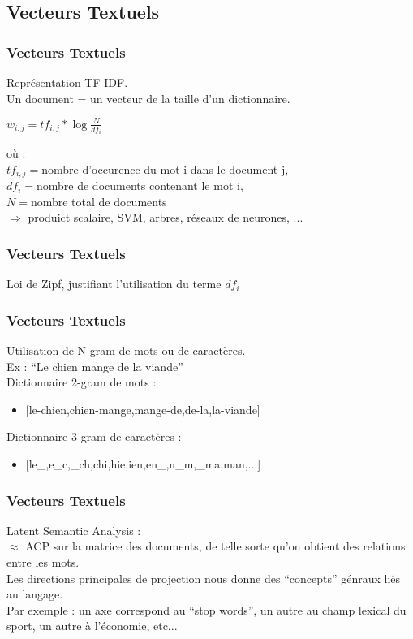 \subsection{Vecteurs Textuels}



\begin{frame}
  \frametitle{Vecteurs Textuels}
  Représentation TF-IDF. \\
  Un document = un vecteur de la taille d'un dictionnaire. \\
  \begin{center}
    $\boxed{w_{i,j} = tf_{i,j}*\log{\frac{N}{df_i}}}$
  \end{center}
  où : \\
  $tf_{i,j} = $nombre d'occurence du mot i dans le document j, \\
  $df_i = $nombre de documents contenant le mot i, \\
  $N = $nombre total de documents \\
  \newline
  $\Rightarrow$ produict scalaire, SVM, arbres, réseaux de neurones, ...
\end{frame}

\begin{frame}
  \frametitle{Vecteurs Textuels}
  Loi de Zipf, justifiant l'utilisation du terme $df_i$
\end{frame}

\begin{frame}
  \frametitle{Vecteurs Textuels}
  Utilisation de N-gram de mots ou de caractères. \\
  \newline
  Ex : ``Le chien mange de la viande''\\
  Dictionnaire 2-gram de mots : \\
  \newline
  \begin{itemize}
  \item {[le-chien,chien-mange,mange-de,de-la,la-viande]}
  \end{itemize}
  Dictionnaire 3-gram de caractères :
  \begin{itemize}
  \item {[le\_,e\_c,\_ch,chi,hie,ien,en\_,n\_m,\_ma,man,...]}
  \end{itemize}
\end{frame}

\begin{frame}
  \frametitle{Vecteurs Textuels}
  Latent Semantic Analysis : \\
  \newline
  $\approx$ ACP sur la matrice des documents, de telle sorte qu'on obtient des relations entre les mots. \\
  Les directions principales de projection nous donne des ``concepts'' génraux liés au langage. \\
  \newline
  Par exemple : un axe correspond au ``stop words'', un autre au champ lexical du sport, un autre à l'économie, etc...  
\end{frame}

